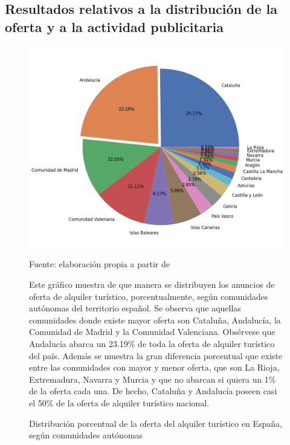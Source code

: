 \documentclass[a4paper,10pt]{article}
\begin{document}
        \subsection{Resultados relativos a la distribución de la oferta y a la actividad publicitaria}

            \begin{figure}[h]
                \begin{center}
                    \includegraphics*[width = 13cm]{graphics/spainccaadensity.png}
                    \begin{flushright}
                        \footnotesize{Fuente: elaboración propia a partir de \cite[(1)]{datahippo}}
                    \end{flushright}
                    \caption{Distribución porcentual de la oferta del alquiler turístico en España, según comunidades autónomas}
                \end{center}
            
                Este gráfico muestra de que manera se distribuyen los anuncios de oferta de alquiler turístico, porcentualmente,
                según comunidades autónomas del territorio español. Se observa que aquellas comunidades donde existe mayor oferta son
                Cataluña, Andalucía, la Comunidad de Madrid y la Comunidad Valenciana. Obsérvese que Andalucía abarca un 23.19\% de toda la 
                oferta de alquiler turístico del país. Además se muestra la gran diferencia porcentual que existe entre las comunidades 
                con mayor y menor oferta, que son La Rioja, Extremadura, Navarra y Murcia y que no abarcan si quiera un 1\% de la oferta cada una.
                De hecho, Cataluña y Andalucía poseen casi el 50\% de la oferta de alquiler turístico nacional.

            \end{figure}
\end{document}
